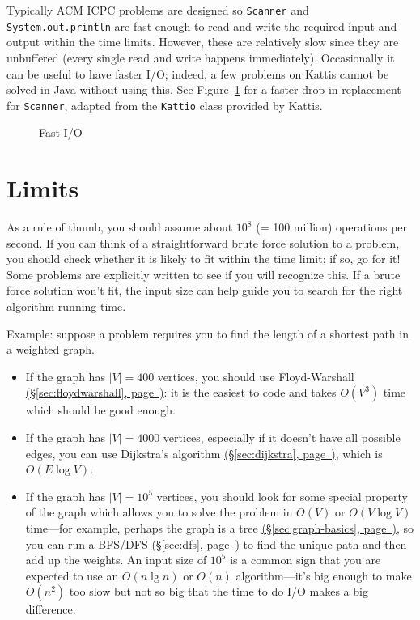\documentclass[10pt]{book}
\newcommand*{\link}[1]{\hyperref[{#1}]{(\S\ref*{#1}, page~\pageref*{#1})}}
\newif\iftodos
\newcommand{\todo}[1]{\iftodos\textcolor{red}{[TODO: #1]}\fi}
\begin{document}
Typically ACM ICPC problems are designed so \texttt{Scanner} and
\texttt{System.out.println} are fast enough to read and write the
required input and output within the time limits.  However, these are
relatively slow since they are unbuffered (every single read and write
happens immediately).  Occasionally it can be useful to have faster
I/O; indeed, a few problems on Kattis cannot be solved in Java without
using this. See Figure~\ref{fig:fastio} for a faster drop-in replacement for
\texttt{Scanner}, adapted from the \texttt{Kattio} class provided by
Kattis.

\begin{figure}
  \small
  \caption{Fast I/O}  \label{fig:fastio}
\end{figure}


\chapter{Limits}

As a rule of thumb, you should assume about $10^8$ (= 100 million)
operations per second.  If you can think of a straightforward brute
force solution to a problem, you should check whether it is likely to
fit within the time limit; if so, go for it!  Some problems are
explicitly written to see if you will recognize this.  If a brute
force solution won't fit, the input size can help guide you to search
for the right algorithm running time.

Example: suppose a problem requires you to find the length of a
shortest path in a weighted graph.
\begin{itemize}
\item If the graph has $|V| = 400$ vertices, you should use
  Floyd-Warshall \link{sec:floydwarshall}: it is the easiest to code and takes $O(V^3)$ time
  which should be good enough.
\item If the graph has $|V| = 4000$ vertices, especially if it doesn't
  have all possible edges, you can use Dijkstra's algorithm
  \link{sec:dijkstra}, which is $O(E \log V)$.
\item If the graph has $|V| = 10^5$ vertices, you should look for some
  special property of the graph which allows you to solve the problem
  in $O(V)$ or $O(V \log V)$ time---for example, perhaps the graph is
  a tree \link{sec:graph-basics}, so you can run a BFS/DFS \link{sec:dfs}
  to find the unique path and then add up the weights.  An input size of
  $10^5$ is a common sign that you are expected to use an $O(n \lg n)$
  or $O(n)$ algorithm---it's big enough to make $O(n^2)$ too slow but
  not so big that the time to do I/O makes a big difference.
\end{itemize}
\end{document}

